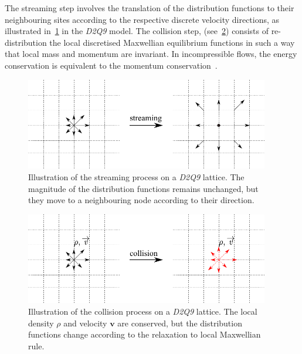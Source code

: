 The streaming step involves the translation of the distribution functions to 
their neighbouring sites according to the respective discrete velocity 
directions, as illustrated in~\cref{fig:stream} in the \textit{D2Q9} model. The 
collision step, (see~\cref{fig:collision}) consists of re-distribution the 
local discretised Maxwellian equilibrium functions in such a way that 
local mass and momentum are invariant. In incompressible flows, the energy 
conservation is equivalent to the momentum conservation~\citep{He1997}.

\begin{figure}[htbp]
	\centering
	\includegraphics[width=0.95\textwidth]{stream}
	\caption[Illustration of the streaming process on a \textit{D2Q9} 
	lattice]{Illustration of the streaming process on a \textit{D2Q9} lattice. 
	The magnitude of the distribution functions remains unchanged, but they 
	move to a neighbouring node according to their direction.}
	\label{fig:stream}
\end{figure}

\begin{figure}[htbp]
	\centering
	\includegraphics[width=0.95\textwidth]{collision}
	\caption[Illustration of the collision process on a \textit{D2Q9} 
	lattice]{Illustration of the collision process on a \textit{D2Q9} lattice. 
	The local density $\rho$ and velocity $\mathbf{v}$ are conserved, but the 
	distribution functions change according to the relaxation to local 
	Maxwellian rule.}
	\label{fig:collision}
\end{figure} 

